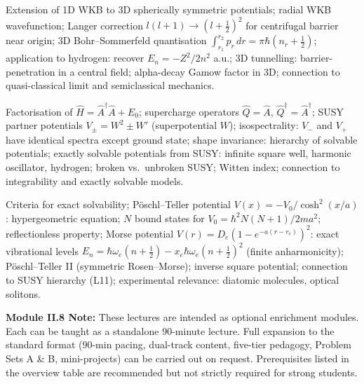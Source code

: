 \documentclass[11pt,a4paper]{article}
\begin{document}
\begin{description}[leftmargin=1.4em, style=nextline, itemsep=6pt]
\item[\textbf{L10 --- The WKB Method in 3D}]
Extension of 1D WKB to 3D spherically symmetric potentials; radial WKB wavefunction; Langer correction $l(l+1)\to(l+\tfrac{1}{2})^2$ for centrifugal barrier near origin; 3D Bohr--Sommerfeld quantisation $\int_{r_1}^{r_2}p_r\,dr=\pi\hbar(n_r+\tfrac{1}{2})$; application to hydrogen: recover $E_n=-Z^2/2n^2$ a.u.; 3D tunnelling: barrier-penetration in a central field; alpha-decay Gamow factor in 3D; connection to quasi-classical limit and semiclassical mechanics.

\item[\textbf{L11 --- Supersymmetric Quantum Mechanics}]
Factorisation of $\hat{H}=\hat{A}^\dagger\hat{A}+E_0$; supercharge operators $\hat{Q}=\hat{A}$, $\hat{Q}^\dagger=\hat{A}^\dagger$; SUSY partner potentials $V_\pm=W^2\pm W'$ (superpotential $W$); isospectrality: $V_-$ and $V_+$ have identical spectra except ground state; shape invariance: hierarchy of solvable potentials; exactly solvable potentials from SUSY: infinite square well, harmonic oscillator, hydrogen; broken vs.\ unbroken SUSY; Witten index; connection to integrability and exactly solvable models.

\item[\textbf{L12 --- Exactly Solvable Models beyond the Harmonic Oscillator}]
Criteria for exact solvability; P\"oschl--Teller potential $V(x)=-V_0/\cosh^2(x/a)$: hypergeometric equation; $N$ bound states for $V_0=\hbar^2N(N+1)/2ma^2$; reflectionless property; Morse potential $V(r)=D_e(1-e^{-a(r-r_e)})^2$: exact vibrational levels $E_n=\hbar\omega_e(n+\tfrac{1}{2})-x_e\hbar\omega_e(n+\tfrac{1}{2})^2$ (finite anharmonicity); P\"oschl--Teller II (symmetric Rosen--Morse); inverse square potential; connection to SUSY hierarchy (L11); experimental relevance: diatomic molecules, optical solitons.

\end{description}

\begin{tcolorbox}[highlightbox]
\textbf{Module II.8 Note:} These lectures are intended as optional enrichment modules. Each can be taught as a standalone 90-minute lecture. Full expansion to the standard format (90-min pacing, dual-track content, five-tier pedagogy, Problem Sets A \& B, mini-projects) can be carried out on request. Prerequisites listed in the overview table are recommended but not strictly required for strong students.
\end{tcolorbox}

\end{document}
